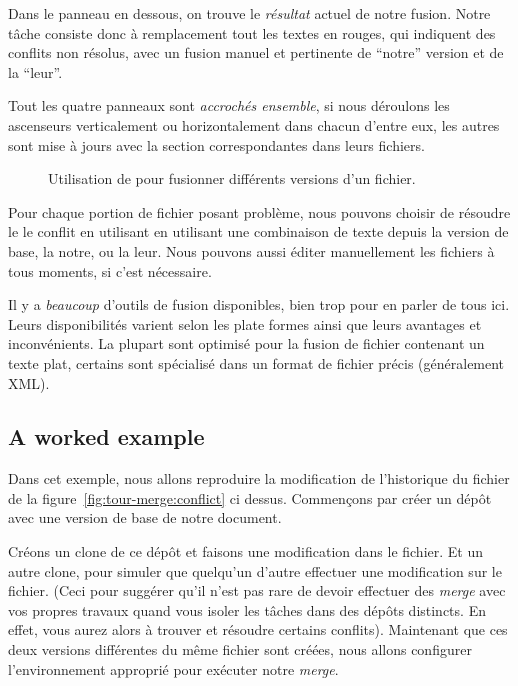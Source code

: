 Dans le panneau en dessous, on trouve le \emph{résultat} actuel de notre
fusion. Notre tâche consiste donc à remplacement tout les textes en rouges,
qui indiquent des conflits non résolus, avec un fusion manuel et pertinente
de ``notre'' version et de la ``leur''. 

Tout les quatre panneaux sont \emph{accrochés ensemble}, si nous déroulons
les ascenseurs verticalement ou horizontalement dans chacun d'entre eux, les
autres sont mise à jours avec la section correspondantes dans leurs fichiers.

\begin{figure}[ht]
  \centering
  \caption{Utilisation de   pour fusionner différents versions
  d'un fichier.}
  \label{fig:tour-merge:kdiff3}
\end{figure}

Pour chaque portion de fichier posant problème, nous pouvons choisir 
de résoudre le le conflit en utilisant en utilisant une combinaison 
de texte depuis la version de base, la notre, ou la leur. Nous pouvons 
aussi éditer manuellement les fichiers à tous moments, si c'est
nécessaire.

Il y a \emph{beaucoup} d'outils de fusion disponibles, bien trop pour
en parler de tous ici. Leurs disponibilités varient selon les plate formes
ainsi que leurs avantages et inconvénients. La plupart sont optimisé pour
la fusion de fichier contenant un texte plat, certains sont spécialisé
dans un format de fichier précis (généralement XML).

\subsection{A worked example} %

Dans cet exemple, nous allons reproduire la modification de l'historique
du fichier de la figure~\ref{fig:tour-merge:conflict} ci dessus. Commençons
par créer un dépôt avec une version de base de notre document.

Créons un clone de ce dépôt et faisons une modification dans le fichier.
Et un autre clone, pour simuler que quelqu'un d'autre effectuer une
modification sur le fichier. (Ceci pour suggérer qu'il n'est pas rare
de devoir effectuer des \textit{merge} avec vos propres travaux quand 
vous isoler les tâches dans des dépôts distincts. En effet, vous 
aurez alors à trouver et résoudre certains conflits).
Maintenant que ces deux versions différentes du même fichier sont 
créées, nous allons configurer l'environnement approprié pour exécuter 
notre \textit{merge}.

